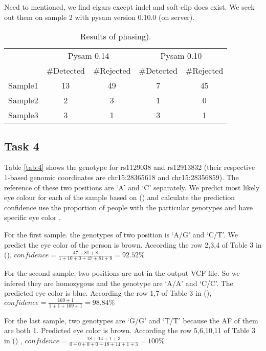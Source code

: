 \documentclass[a4paper]{article}
\begin{document}
Need to mentioned, we find cigars except indel and soft-clip does exist. We seek out them on sample 2 with pysam version 0.10.0 (on server).

\begin{table}[H]
	\centering
	\begin{tabular}{c|cc|cc}
		\hline
		& \multicolumn{2}{c|}{Pysam 0.14}  &  \multicolumn{2}{c}{Pysam 0.10}   \\
		& $\#$Detected & $\#$Rejected & $\#$Detected & $\#$Rejected \\	 
		\hline
		Sample1 & 13  & 49 & 7 & 45 \\
		\hline
		Sample2 & 2 & 3 & 1 & 0  \\
		\hline
		Sample3 & 3 & 1 & 3 & 1  \\
		\hline
	\end{tabular}
	\caption{\label{tab:3}Results of phasing).}
\end{table}


\subsection{Task 4}

Table \ref{tab:4} shows the genotype for rs1129038 and rs12913832 (their respective 1-based genomic coordinates are chr15:28365618 and chr15:28356859). The reference of these two positions are `A' and `C' separately. We predict most likely eye colour for each of the sample  based on (\cite{Sturm2008A}) and calculate the prediction confidence use the proportion of people with the particular genotypes and have specific eye color .

For the first sample. the genotypes of two position is `A/G' and `C/T'. We predict the eye color of the person is brown. According the row 2,3,4 of Table 3 in (\cite{Sturm2008A}), $confidence =\frac{47+81+8}{1+10+0+47+81+8}=92.52\%$

For the second sample, two positions are not in the output VCF file. So we infered they are homozygous and the genotype are `A/A' and `C/C'. The predicted eye color is blue. According the row 1,7 of Table 3 in (\cite{Sturm2008A}), $confidence =\frac{169+1}{1+1+169+1}=98.84\%$

For the last sample, two genotypes are `G/G' and `T/T' because the AF of them are both 1. Predicted eye color is brown. According the row 5,6,10,11 of Table 3 in (\cite{Sturm2008A}) , $confidence =\frac{18+14+1+3}{0+0+0+0+18+14+1+3}=100\%$
\end{document}
